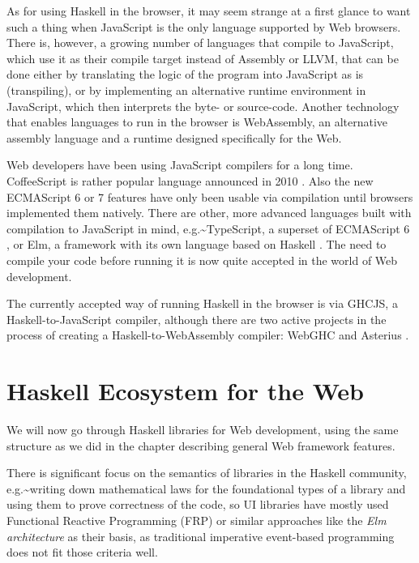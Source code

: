 \documentclass[english,odsaz]{fitthesis}
\begin{document}
As for using Haskell in the browser, it may seem strange at a first glance to
want such a thing when JavaScript is the only language supported by Web
browsers. There is, however, a growing number of languages that compile to
JavaScript, which use it as their compile target instead of Assembly or LLVM,
that can be done either by translating the logic of the program into JavaScript
as is (transpiling), or by implementing an alternative runtime environment in
JavaScript, which then interprets the byte- or source-code. Another technology
that enables languages to run in the browser is WebAssembly, an alternative
assembly language and a runtime designed specifically for the Web.

Web developers have been using JavaScript compilers for a long time.
CoffeeScript is rather popular language announced in 2010
\cite{coffeescript}. Also the new ECMAScript 6 or 7 features have only been usable
via compilation until browsers implemented them natively. There are other, more
advanced languages built with compilation to JavaScript in mind,
e.g.\textasciitilde{}TypeScript, a superset of ECMAScript 6 \cite{typescript}, or Elm, a framework
with its own language based on Haskell \cite{czaplicki2012elm}. The need to
compile your code before running it is now quite accepted in the world of Web
development.

The currently accepted way of running Haskell in the browser is via GHCJS, a
Haskell-to-JavaScript compiler, although there are two active projects in the
process of creating a Haskell-to-WebAssembly compiler: WebGHC \cite{webghc} and
Asterius \cite{asterius}.

\section{Haskell Ecosystem for the Web}
\label{sec:org093b7eb}
We will now go through Haskell libraries for Web development, using the same
structure as we did in the chapter describing general Web framework features.

There is significant focus on the semantics of libraries in the Haskell
community, e.g.\textasciitilde{}writing down mathematical laws for the foundational types of a
library and using them to prove correctness of the code, so UI libraries have
mostly used Functional Reactive Programming (FRP) or similar approaches like
the \emph{Elm architecture} \cite{loder2018web} as their basis, as traditional
imperative event-based programming does not fit those criteria well.
\end{document}
